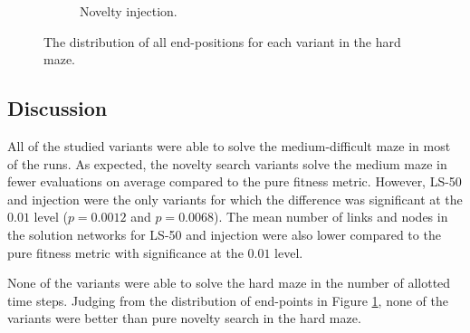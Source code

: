 \begin{figure}[H]
\begin{mdframed}
\begin{subfigure}[b]{0.5\textwidth}
            \caption{Novelty injection.}
        \end{subfigure}
    \end{mdframed}
    \caption{The distribution of all end-positions for each variant in the hard maze.}
    \label{distribution}
\end{figure}

\newpage
\subsection{Discussion}
All of the studied variants were able to solve the medium-difficult maze in most of the runs.
As expected, the novelty search variants solve the medium maze in fewer evaluations on average
compared to the pure fitness metric. However, LS-50 and injection were the only variants for which
the difference was significant at the $0.01$ level ($p=0.0012$ and $p=0.0068$). The mean number of
links and nodes in the solution networks for LS-50 and injection were also lower
compared to the pure fitness metric with significance at the $0.01$ level.

None of the variants were able to solve the hard maze in the number of allotted time steps.
Judging from the distribution of end-points in Figure \ref{distribution}, none of the variants
were better than pure novelty search in the hard maze.